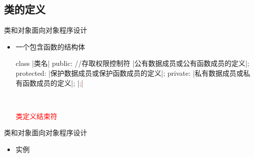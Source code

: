 \subsection[类的定义]{类的定义}\label{sec:chap03-sec01-03}
\begin{frame}[t, fragile]{类和对象}{面向对象程序设计}%
  \begin{itemize}
  \item 一个包含函数的结构体\\
    \centering
    \vspace{4ex}
    \begin{minipage}{0.6\linewidth}
      \begin{cpptt}
class |类名|
{
public: //存取权限控制符
    |公有数据成员或公有函数成员的定义|;
protected:
    |保护数据成员或保护函数成员的定义|;
private:
    |私有数据成员或私有函数成员的定义|;
}|\textcolor{red}{;}|
      \end{cpptt}
    \end{minipage}\\
    \hspace{4em}
    \begin{minipage}{0.2\linewidth}
      \textcolor{red}{\tiny {} 类定义结束符}
    \end{minipage}
  \end{itemize}
\end{frame}

\begin{frame}[t, fragile]{类和对象}{面向对象程序设计}%
  \begin{itemize}
  \item 实例\\[2ex]
    \centering
    \begin{minipage}{0.6\linewidth}
    \end{minipage}
  \end{itemize}
\end{frame}

